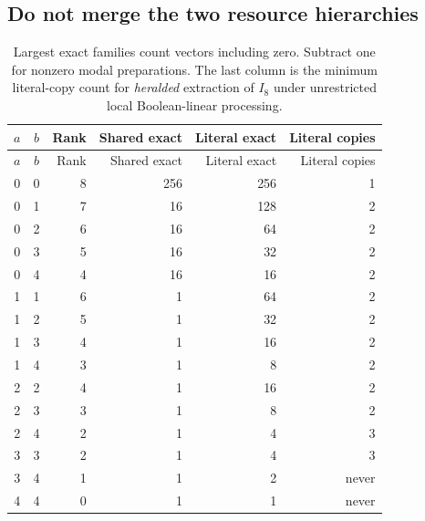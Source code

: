 \subsection{Do not merge the two resource hierarchies}
\begin{longtable}{@{}ccrrrr@{}}
\caption{Largest exact families count vectors including zero. Subtract one for nonzero modal preparations. The last column is the minimum literal-copy count for \emph{heralded} extraction of $I_8$ under unrestricted local Boolean-linear processing.}\label{tab:hierarchy}\\
\toprule $a$ & $b$ & Rank & Shared exact & Literal exact & Literal copies\\\midrule\endfirsthead
\toprule $a$ & $b$ & Rank & Shared exact & Literal exact & Literal copies\\\midrule\endhead
0 & 0 & 8 & 256 & 256 & 1\\
0 & 1 & 7 & 16 & 128 & 2\\
0 & 2 & 6 & 16 & 64 & 2\\
0 & 3 & 5 & 16 & 32 & 2\\
0 & 4 & 4 & 16 & 16 & 2\\
1 & 1 & 6 & 1 & 64 & 2\\
1 & 2 & 5 & 1 & 32 & 2\\
1 & 3 & 4 & 1 & 16 & 2\\
1 & 4 & 3 & 1 & 8 & 2\\
2 & 2 & 4 & 1 & 16 & 2\\
2 & 3 & 3 & 1 & 8 & 2\\
2 & 4 & 2 & 1 & 4 & 3\\
3 & 3 & 2 & 1 & 4 & 3\\
3 & 4 & 1 & 1 & 2 & never\\
4 & 4 & 0 & 1 & 1 & never\\
\bottomrule\end{longtable}
